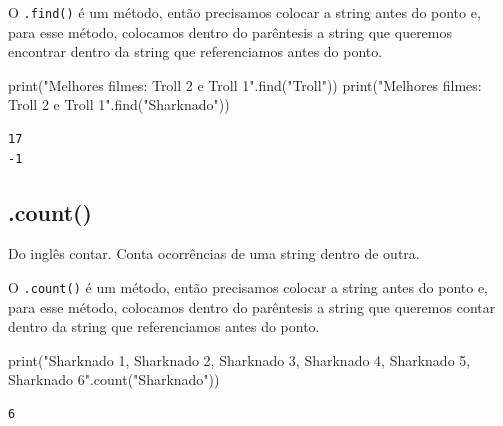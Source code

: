 \documentclass[
  letterpaper,
  DIV=11,
  numbers=noendperiod]{scrreprt}
\newenvironment{Shaded}{\begin{snugshade}}{\end{snugshade}}
\newcommand{\BuiltInTok}[1]{\textcolor[rgb]{0.00,0.23,0.31}{#1}}
\newcommand{\NormalTok}[1]{\textcolor[rgb]{0.00,0.23,0.31}{#1}}
\newcommand{\StringTok}[1]{\textcolor[rgb]{0.13,0.47,0.30}{#1}}
\begin{document}
O \texttt{.find()} é um método, então precisamos colocar a string antes
do ponto e, para esse método, colocamos dentro do parêntesis a string
que queremos encontrar dentro da string que referenciamos antes do
ponto.

\begin{Shaded}
\begin{Highlighting}[]
\BuiltInTok{print}\NormalTok{(}\StringTok{"Melhores filmes: Troll 2 e Troll 1"}\NormalTok{.find(}\StringTok{"Troll"}\NormalTok{))}
\BuiltInTok{print}\NormalTok{(}\StringTok{"Melhores filmes: Troll 2 e Troll 1"}\NormalTok{.find(}\StringTok{"Sharknado"}\NormalTok{))}
\end{Highlighting}
\end{Shaded}

\begin{tcolorbox}[enhanced jigsaw, breakable, leftrule=.75mm, left=2mm, opacityback=0, bottomrule=.15mm, toprule=.15mm, rightrule=.15mm, arc=.35mm, colback=white]

\begin{verbatim}
17
-1
\end{verbatim}

\end{tcolorbox}

\hypertarget{count}{%
\subsection{.count()}\label{count}}

Do inglês contar. Conta ocorrências de uma string dentro de outra.

O \texttt{.count()} é um método, então precisamos colocar a string antes
do ponto e, para esse método, colocamos dentro do parêntesis a string
que queremos contar dentro da string que referenciamos antes do ponto.

\begin{Shaded}
\begin{Highlighting}[]
\BuiltInTok{print}\NormalTok{(}\StringTok{"Sharknado 1, Sharknado 2, Sharknado 3, Sharknado 4, Sharknado 5, Sharknado 6"}\NormalTok{.count(}\StringTok{"Sharknado"}\NormalTok{))}
\end{Highlighting}
\end{Shaded}

\begin{tcolorbox}[enhanced jigsaw, breakable, leftrule=.75mm, left=2mm, opacityback=0, bottomrule=.15mm, toprule=.15mm, rightrule=.15mm, arc=.35mm, colback=white]

\begin{verbatim}
6
\end{verbatim}

\end{tcolorbox}
\end{document}
